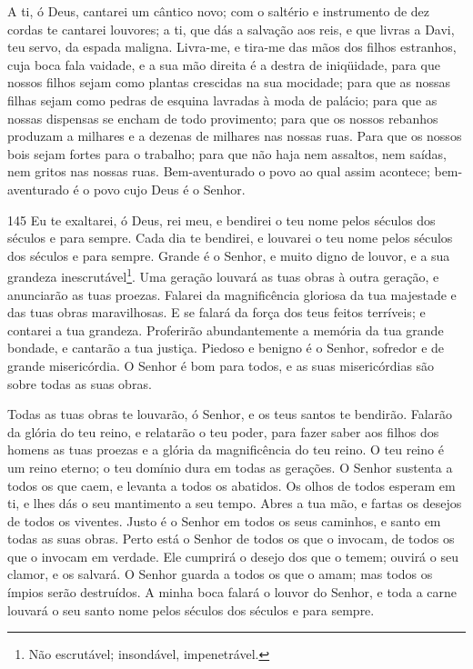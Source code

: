 A ti, ó Deus, cantarei um cântico novo; com o saltério e
instrumento de dez cordas te cantarei louvores; a ti, que dás
a salvação aos reis, e que livras a Davi, teu servo, da espada
maligna. Livra-me, e tira-me das mãos dos filhos estranhos,
cuja boca fala vaidade, e a sua mão direita é a destra de
iniqüidade, para que nossos filhos sejam como plantas
crescidas na sua mocidade; para que as nossas filhas sejam como
pedras de esquina lavradas à moda de palácio; para que as
nossas dispensas se encham de todo provimento; para que os nossos
rebanhos produzam a milhares e a dezenas de milhares nas nossas
ruas. Para que os nossos bois sejam fortes para o trabalho;
para que não haja nem assaltos, nem saídas, nem gritos nas nossas
ruas. Bem-aventurado o povo ao qual assim acontece;
bem-aventurado é o povo cujo Deus é o Senhor.

\bigskip

\lettrine{145}{} Eu te exaltarei, ó Deus, rei meu, e bendirei o
teu nome pelos séculos dos séculos e para sempre. Cada dia te
bendirei, e louvarei o teu nome pelos séculos dos séculos e para
sempre. Grande é o Senhor, e muito digno de louvor, e a sua
grandeza inescrutável\footnote{Não escrutável; insondável,
impenetrável.}. Uma geração louvará as tuas obras à outra
geração, e anunciarão as tuas proezas. Falarei da magnificência
gloriosa da tua majestade e das tuas obras maravilhosas. E se
falará da força dos teus feitos terríveis; e contarei a tua
grandeza. Proferirão abundantemente a memória da tua grande
bondade, e cantarão a tua justiça. Piedoso e benigno é o Senhor,
sofredor e de grande misericórdia. O Senhor é bom para todos, e
as suas misericórdias são sobre todas as suas obras.

Todas as tuas obras te louvarão, ó Senhor, e os teus santos te
bendirão. Falarão da glória do teu reino, e relatarão o teu
poder, para fazer saber aos filhos dos homens as tuas proezas
e a glória da magnificência do teu reino. O teu reino é um
reino eterno; o teu domínio dura em todas as gerações. O
Senhor sustenta a todos os que caem, e levanta a todos os abatidos.
Os olhos de todos esperam em ti, e lhes dás o seu mantimento
a seu tempo. Abres a tua mão, e fartas os desejos de todos os
viventes. Justo é o Senhor em todos os seus caminhos, e santo
em todas as suas obras. Perto está o Senhor de todos os que o
invocam, de todos os que o invocam em verdade. Ele cumprirá o
desejo dos que o temem; ouvirá o seu clamor, e os salvará. O
Senhor guarda a todos os que o amam; mas todos os ímpios serão
destruídos. A minha boca falará o louvor do Senhor, e toda a
carne louvará o seu santo nome pelos séculos dos séculos e para
sempre.


